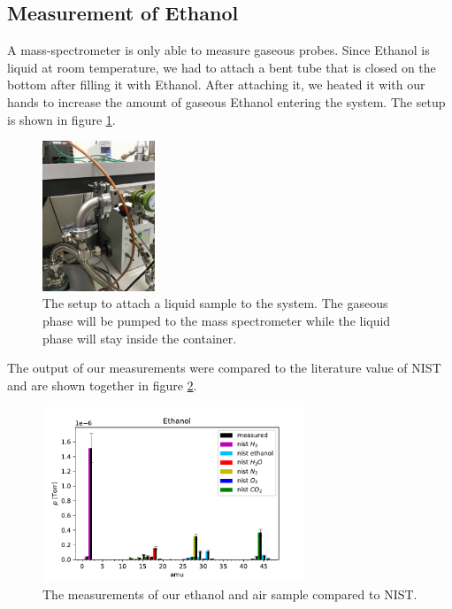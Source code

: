     
    \subsection{Measurement of Ethanol}
    
    
    A mass-spectrometer is only able to measure gaseous probes. Since Ethanol is liquid at room temperature, we had to attach a bent tube that is closed on the bottom after filling it with Ethanol. After attaching it, we heated it with our hands to increase the amount of gaseous Ethanol entering the system. The setup is shown in figure \ref{fig:ethanol}.
    \begin{figure}[h!]
    \centering
    \includegraphics[angle=-90, origin=c, width=0.3\textwidth]{Report/pictures/liquids.JPG}
    \caption{The setup to attach a liquid sample to the system. The gaseous phase will be pumped to the mass spectrometer while the liquid phase will stay inside the container.}
    \label{fig:ethanol}
    \end{figure}
    The output of our measurements were compared to the literature value of NIST \cite{NIST} and are shown together in figure \ref{fig:ethanol2}.
    \begin{figure}[h!]
    \centering
    \includegraphics[width=0.7\textwidth]{Report/DataResultsPlots/ethanol.pdf}
    \caption{The measurements of our ethanol and air sample compared to NIST.}
    \label{fig:ethanol2}
    \end{figure}
    
